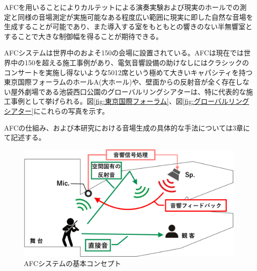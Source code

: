 \documentclass[11pt,a4j]{jreport}
\begin{document}
AFCを用いることによりカルテットによる演奏実験および現実のホールでの測定と同様の音場測定が実施可能なある程度広い範囲に現実に即した自然な音場を生成することが可能であり、また導入する室をもともとの響きのない半無響室とすることで大きな制御幅を得ることが期待できる。

AFCシステムは世界中のおよそ150の会場に設置されている\cite{afcEnhance納入実績}。AFCは現在では世界中の150を超える施工事例があり、電気音響設備の助けなしにはクラシックのコンサートを実施し得ないような5012席という極めて大きいキャパシティを持つ東京国際フォーラムのホールA(大ホール)や、壁面からの反射音が全く存在しない屋外劇場である池袋西口公園のグローバルリングシアターは、特に代表的な施工事例として挙げられる。図\ref{fig:東京国際フォーラム}、図\ref{fig:グローバルリングシアター}にこれらの写真を示す。

AFCの仕組み、および本研究における音場生成の具体的な手法については3章にて記述する。

\newpage

\begin{figure}[H]
  \centering
  \includegraphics[width=.8\linewidth]{images/afcBasicConcept.png}
  \caption{AFCシステムの基本コンセプト}
  \label{fig:AFCシステムの基本コンセプト}
\end{figure}
\end{document}
